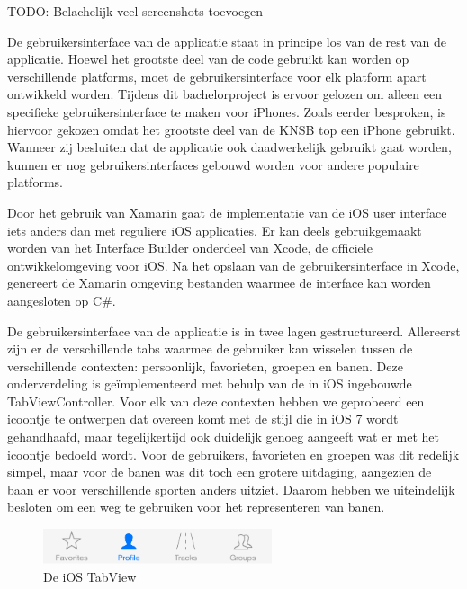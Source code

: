 {\par \bigskip \par \color{red} TODO: Belachelijk veel screenshots toevoegen \par \bigskip \par }

De gebruikersinterface van de applicatie staat in principe los van de rest van de applicatie. Hoewel het grootste deel van de code gebruikt kan worden op verschillende platforms, moet de gebruikersinterface voor elk platform apart ontwikkeld worden. Tijdens dit bachelorproject is ervoor gelozen om alleen een specifieke gebruikersinterface te maken voor iPhones. Zoals eerder besproken, is hiervoor gekozen omdat het grootste deel van de KNSB top een iPhone gebruikt. Wanneer zij besluiten dat de applicatie ook daadwerkelijk gebruikt gaat worden, kunnen er nog gebruikersinterfaces gebouwd worden voor andere populaire platforms.

Door het gebruik van Xamarin gaat de implementatie van de iOS user interface iets anders dan met reguliere iOS applicaties. Er kan deels gebruikgemaakt worden van het Interface Builder onderdeel van Xcode, de officiele ontwikkelomgeving voor iOS. Na het opslaan van de gebruikersinterface in Xcode, genereert de Xamarin omgeving bestanden waarmee de interface kan worden aangesloten op C\#.

De gebruikersinterface van de applicatie is in twee lagen gestructureerd. Allereerst zijn er de verschillende tabs waarmee de gebruiker kan wisselen tussen de verschillende contexten: persoonlijk, favorieten, groepen en banen. Deze onderverdeling is geïmplementeerd met behulp van de in iOS ingebouwde TabViewController. Voor elk van deze contexten hebben we geprobeerd een icoontje te ontwerpen dat overeen komt met de stijl die in iOS 7 wordt gehandhaafd, maar tegelijkertijd ook duidelijk genoeg aangeeft wat er met het icoontje bedoeld wordt. Voor de gebruikers, favorieten en groepen was dit redelijk simpel, maar voor de banen was dit toch een grotere uitdaging, aangezien de baan er voor verschillende sporten anders uitziet. Daarom hebben we uiteindelijk besloten om een weg te gebruiken voor het representeren van banen.

\begin{figure}[H]
\centering
\includegraphics[width=0.6\textwidth]{style/images/TabView}
\caption{De iOS TabView}
\label{fig:tab-view}
\end{figure}

